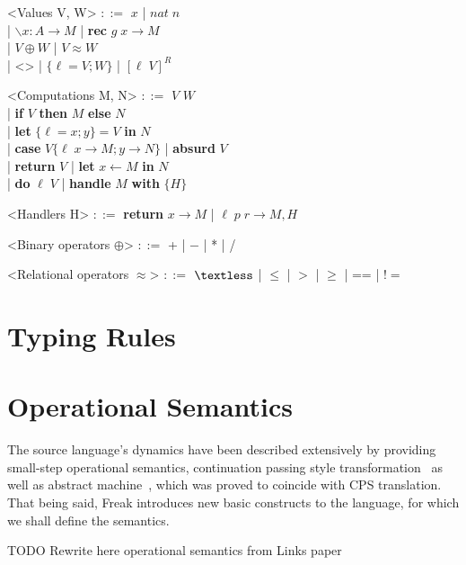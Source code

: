 \documentclass[declaration,shortabstract]{iithesis}
\theoremstyle{definition} \newtheorem{definition}{Definition}[chapter]
\theoremstyle{remark} \newtheorem{remark}[definition]{Observation}
\theoremstyle{plain} \newtheorem{theorem}[definition]{Theorem}
\theoremstyle{plain} \newtheorem{lemma}[definition]{Lemma}
\begin{document}
    \begin{grammar}

        <Values V, W> $::=$ $ x $ | $nat \; n$ \\
            | $ \backslash x : A \rightarrow M $ | \textbf{rec} $ g \; x \rightarrow M $\\
            | $V \oplus W$ | $V \approx W$ \\
            | <> | $ \{ \ell = V; W\} $  | ${[ \ell \; V]}^{R}$

        <Computations M, N> $::=$ $ V $ $ W $ \\
            | \textbf{if} $V$ \textbf{then} $M$ \textbf{else} $N$ \\
            | \textbf{let} $\{\ell  = x; y\} = V$ \textbf{in} $ N $ \\
            | \textbf{case} $V \{ \ell \; x \rightarrow M; y \rightarrow N\}$ | \textbf{absurd} $ V $ \\
            | \textbf{return} $V$ | \textbf{let} $ x \leftarrow M $ \textbf{in} $ N $ \\
            | \textbf{do} $\ell \; V$ | \textbf{handle} $M$ \textbf{with} $ \{ H \} $

        <Handlers H> $::=$ \textbf{return} $ x \rightarrow M $ | $ \ell \; p \; r \rightarrow M, H $

        <Binary operators $\oplus$> $::=$ + | $-$ | * | /

        <Relational operators $\approx$> $::=$ $ \textless $ | $\leqslant$ | $>$ | $\geqslant$ | == | $!= $

    \end{grammar}

\section{Typing Rules}
\section{Operational Semantics}

    The source language's dynamics have been described
    extensively by providing small-step operational semantics,
    continuation passing style transformation~\cite{handlers-cps} as well
    as abstract machine~\cite{liberating-effects}, which was proved to coincide
    with CPS translation. That being said, Freak introduces new basic
    constructs to the language, for which we shall define the semantics.

    TODO Rewrite here operational semantics from Links paper
\end{document}
